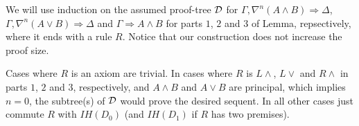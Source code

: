 We will use induction on the assumed proof-tree $\mathcal{D}$ for $\Gamma, \nabla^n (A \wedge B) \Rightarrow \Delta$, $\Gamma, \nabla^n (A \vee B) \Rightarrow \Delta$ and $\Gamma \Rightarrow A \wedge B$ for parts $1$, $2$ and $3$ of Lemma, repsectively, where it ends with a rule $R$. Notice that our construction does not increase the proof size.

Cases where $R$ is an axiom are trivial. In cases where $R$ is $L \wedge$, $L \vee$ and $R \wedge$ in parts $1$, $2$ and $3$, respectively, and $A \wedge B$ and $A \vee B$ are principal, which implies $n = 0$, the subtree(s) of $\mathcal{D}$ would prove the desired sequent. In all other cases just commute $R$ with $IH(D_0)$ (and $IH(D_1)$ if $R$ has two premises).
